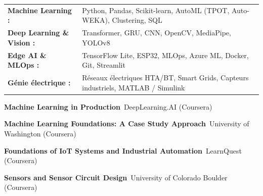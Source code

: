 \documentclass[10pt,a4paper]{../altacv}
\begin{document}
\begin{tabular}{@{}ll@{}}
\textbf{Machine Learning :} & Python, Pandas, Scikit-learn, AutoML (TPOT, Auto-WEKA), Clustering, SQL \\[1.5pt]
\textbf{Deep Learning \& Vision :} & Transformer, GRU, CNN, OpenCV, MediaPipe, YOLOv8 \\[1.5pt]
\textbf{Edge AI \& MLOps :} & TensorFlow Lite, ESP32, MLOps, Azure ML, Docker, Git, Streamlit \\[1.5pt]
\textbf{Génie électrique :} & Réseaux électriques HTA/BT, Smart Grids, Capteurs industriels, MATLAB / Simulink
\end{tabular}

\begin{cvitems}
  \item \textbf{Machine Learning in Production}~\hfill {\color{emphasis}DeepLearning.AI (Coursera)}
  \item \textbf{Machine Learning Foundations: A Case Study Approach}~\hfill {\color{emphasis}University of Washington (Coursera)}
  \item \textbf{Foundations of IoT Systems and Industrial Automation}~\hfill {\color{emphasis}LearnQuest (Coursera)}
  \item \textbf{Sensors and Sensor Circuit Design}~\hfill {\color{emphasis}University of Colorado Boulder (Coursera)}
\end{cvitems}

\cvactivites
\cvlangues
\end{document}
